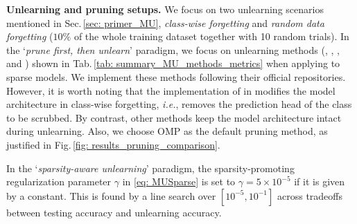 \noindent \textbf{Unlearning and pruning setups.}
 We   focus on two unlearning scenarios mentioned in Sec.\,\ref{sec: primer_MU}, \textit{class-wise forgetting} and \textit{random data forgetting} ({$10\%$ of the whole training dataset} {together with 10 random trials}). 
In the `\textit{prune first, then unlearn}' paradigm, we   focus on unlearning methods ({\FT}, {\GA}, {\FF},  and {\IU}) shown in Tab.\,\ref{tab: summary_MU_methods_metrics}
when applying to sparse models.
We  implement these methods following their official repositories. However, it is worth noting that  the  implementation of {\FF} in \citet{golatkar2020eternal}
modifies the model architecture in class-wise forgetting, \textit{i.e.}, removes the  prediction head  of the class to be scrubbed. 
By contrast, other   methods   keep the model architecture  intact during unlearning. 
Also, we choose {OMP} as the  default pruning method, 
as justified in Fig.\,\ref{fig: results_pruning_comparison}.
\iffalse 
If we relax such a condition for {\FF},  then the  unlearning performance would significantly degrade. Thus, even if it may lack fairness to compare  other methods with {\FF}, we cover the latter in class-wise forgetting for completeness. 
\fi
\iffalse
In the `\textit{sparsity-aware unlearning}' paradigm,  the sparsity-promoting regularization parameter $\gamma$  in   \eqref{eq: MUSparse} is set to   $\gamma = 5\times10^{-5}$ if it is given by a constant. This is found by a line search over $[10^{-5}, 10^{-1}]$ across   tradeoffs between testing accuracy and unlearning accuracy. 

